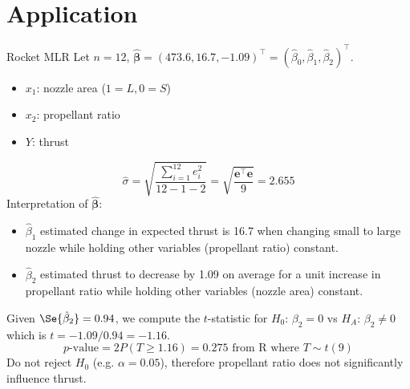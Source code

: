 \section{Application}
\begin{Example}{Rocket MLR}{}
    Let $ n=12 $, $ \hat{\symbf{\beta}}=(473.6, 16.7,-1.09)^\top
        =(\hat{\beta}_0,\hat{\beta}_1,\hat{\beta}_2)^\top $.
    \begin{itemize}
        \item $ x_1 $: nozzle area ($ 1 = L,0=S $)
        \item $ x_2 $: propellant ratio
        \item $ Y $: thrust
    \end{itemize}
    \[ \hat{\sigma}=\sqrt{\frac{\sum\limits_{i=1}^{12} e_i^2}{12-1-2}}=
        \sqrt{\frac{\symbf{e}^\top \symbf{e}}{9}}=
        2.655 \]
    Interpretation of $ \hat{\symbf{\beta}} $:
    \begin{itemize}
        \item $ \hat{\beta}_1 $ estimated change in expected thrust is 16.7
              when changing small to large nozzle while holding other variables
              (propellant ratio) constant.
        \item $ \hat{\beta}_2 $ estimated thrust to decrease by 1.09 on average
              for a unit increase in propellant ratio while holding other
              variables (nozzle area) constant.
    \end{itemize}
    Given $ \Se{\hat{\beta}_2}=0.94 $,
    we compute the $ t $-statistic for $ H_0 $: $ \beta_2=0 $ vs $ H_A $: $ \beta_2\neq 0 $
    which is $ t=-1.09/0.94=-1.16 $.
    \[ p\text{-value}=2P(T\geqslant 1.16)=0.275\text{ from R where } T \sim t(9)\]
    Do not reject $ H_0 $ (e.g. $ \alpha=0.05 $), therefore
    propellant ratio does not significantly influence thrust.
\end{Example}
